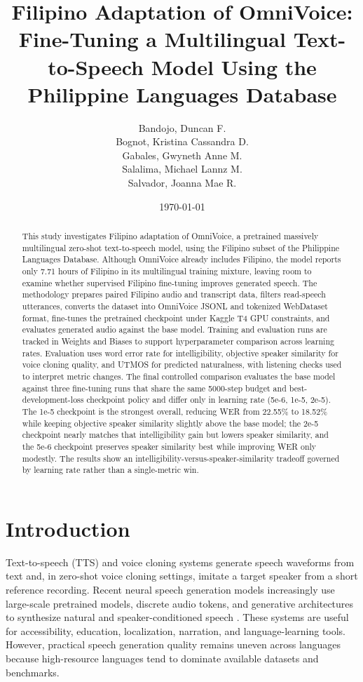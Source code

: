 \documentclass[11pt]{article}
\title{\textbf{Filipino Adaptation of OmniVoice: Fine-Tuning a Multilingual Text-to-Speech Model Using the Philippine Languages Database}}
\author{Bandojo, Duncan F.\\
Bognot, Kristina Cassandra D.\\
Gabales, Gwyneth Anne M.\\
Salalima, Michael Lannz M.\\
Salvador, Joanna Mae R.}
\date{\today}
\begin{document}
\maketitle

\begin{abstract}
This study investigates Filipino adaptation of OmniVoice, a pretrained massively multilingual zero-shot text-to-speech model, using the Filipino subset of the Philippine Languages Database. Although OmniVoice already includes Filipino, the model reports only 7.71 hours of Filipino in its multilingual training mixture, leaving room to examine whether supervised Filipino fine-tuning improves generated speech. The methodology prepares paired Filipino audio and transcript data, filters read-speech utterances, converts the dataset into OmniVoice JSONL and tokenized WebDataset format, fine-tunes the pretrained checkpoint under Kaggle T4 GPU constraints, and evaluates generated audio against the base model. Training and evaluation runs are tracked in Weights and Biases to support hyperparameter comparison across learning rates. Evaluation uses word error rate for intelligibility, objective speaker similarity for voice cloning quality, and UTMOS for predicted naturalness, with listening checks used to interpret metric changes. The final controlled comparison evaluates the base model against three fine-tuning runs that share the same 5000-step budget and best-development-loss checkpoint policy and differ only in learning rate (5e-6, 1e-5, 2e-5). The 1e-5 checkpoint is the strongest overall, reducing WER from 22.55\% to 18.52\% while keeping objective speaker similarity slightly above the base model; the 2e-5 checkpoint nearly matches that intelligibility gain but lowers speaker similarity, and the 5e-6 checkpoint preserves speaker similarity best while improving WER only modestly. The results show an intelligibility-versus-speaker-similarity tradeoff governed by learning rate rather than a single-metric win.
\end{abstract}

\section{Introduction}

Text-to-speech (TTS) and voice cloning systems generate speech waveforms from text and, in zero-shot voice cloning settings, imitate a target speaker from a short reference recording. Recent neural speech generation models increasingly use large-scale pretrained models, discrete audio tokens, and generative architectures to synthesize natural and speaker-conditioned speech \citep{valle,voicebox,maskgct,omnivoice}. These systems are useful for accessibility, education, localization, narration, and language-learning tools. However, practical speech generation quality remains uneven across languages because high-resource languages tend to dominate available datasets and benchmarks.
\end{document}
